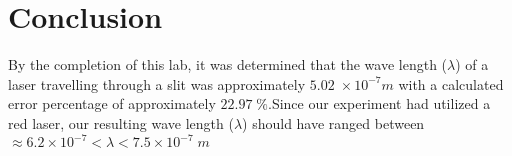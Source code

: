 \documentclass{article}
\begin{document}
\section*{Conclusion} {
    By the completion of this lab, it was determined that the wave length ($\lambda$) of a laser travelling through a slit was approximately $5.02\;\times 10^{-7}m$ with a calculated error percentage of approximately $22.97\;\%$.\newline\newline Since our experiment had utilized a red laser, our resulting wave length ($\lambda$) should have ranged between $\approx 6.2 \times 10^{-7} < \lambda < 7.5 \times 10^{-7}\;m$
}
\end{document}
